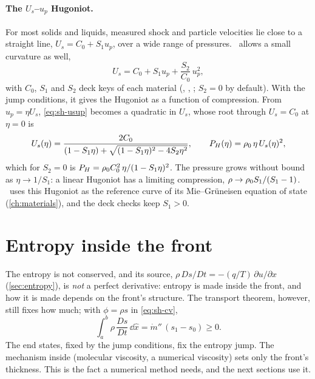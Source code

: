 \paragraph{The $U_s$--$u_p$ Hugoniot.} For most solids and liquids,
measured shock and particle velocities lie close to a straight line,
$U_s = C_0 + S_1 u_p$, over a wide range of pressures. \bw\ allows a
small curvature as well,
\begin{equation}
U_s = C_0 + S_1 u_p + \frac{S_2}{C_0}\,u_p^2,
\label{eq:sh-usup}
\end{equation}
with $C_0$, $S_1$ and $S_2$ deck keys of each material (,
, ; $S_2 = 0$ by default). With the jump conditions, it
gives the Hugoniot as a function of compression. From $u_p = \eta U_s$,
\cref{eq:sh-usup} becomes a quadratic in $U_s$, whose root through
$U_s = C_0$ at $\eta = 0$ is
\begin{equation}
U_s(\eta) = \frac{2C_0}{(1 - S_1\eta) + \sqrt{(1 - S_1\eta)^2 - 4S_2\eta^2}},
\qquad
P_H(\eta) = \rho_0\,\eta\,U_s(\eta)^2,
\label{eq:sh-hugoniot}
\end{equation}
which for $S_2 = 0$ is $P_H = \rho_0 C_0^2\,\eta/(1 - S_1\eta)^2$. The
pressure grows without bound as $\eta \to 1/S_1$: a linear Hugoniot has a
limiting compression, $\rho \to \rho_0 S_1/(S_1 - 1)$. \bw\ uses this
Hugoniot as the reference curve of its Mie--Gr\"uneisen equation of state
(\cref{ch:materials}), and the deck checks keep $S_1 > 0$.

\section{Entropy inside the front}
\label{sec:shock-entropy}

The entropy is not conserved, and its source, $\rho\,Ds/Dt = -(q/T)\,
\partial u/\partial x$ (\cref{sec:entropy}), is \emph{not} a perfect
derivative: entropy is made inside the front, and how it is made depends on
the front's structure. The transport theorem, however, still fixes how
much; with $\phi = \rho s$ in \cref{eq:sh-cv},
\begin{equation}
\int_a^b \rho\,\frac{Ds}{Dt}\,\dd\hat x = \dot m''\,(s_1 - s_0) \ge 0 .
\label{eq:sh-entropy}
\end{equation}
The end states, fixed by the jump conditions, fix the entropy jump. The
mechanism inside (molecular viscosity, a numerical viscosity) sets only
the front's thickness. This is the fact a numerical method needs, and the
next sections use it.

